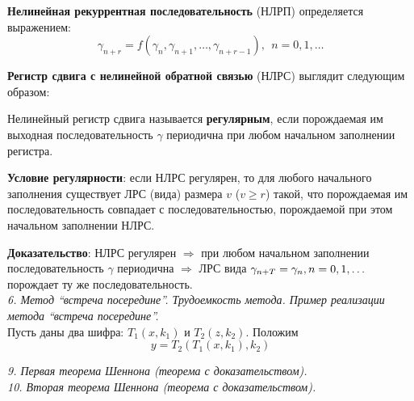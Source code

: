 \textbf{Нелинейная рекуррентная последовательность} (НЛРП) определяется выражением:
$$\gamma_{n+r} = f (\gamma_n, \gamma_{n+1}, \ldots, \gamma_{n+r-1}),\ \ n = 0,1,\ldots$$

\textbf{Регистр сдвига с нелинейной обратной связью} (НЛРС) выглядит следующим образом:

\medskip


\medskip

Нелинейный регистр сдвига называется \textbf{регулярным}, если порождаемая им выходная последовательность $\gamma$ периодична при любом начальном заполнении регистра.

\textbf{Условие регулярности}: если НЛРС регулярен, то для любого начального заполнения существует ЛРС (вида) размера $v$ ($v \ge r$) такой, что порождаемая им последовательность совпадает с последовательностью, порождаемой при этом начальном заполнении НЛРС.

\textbf{Доказательство}: НЛРС регулярен $\Rightarrow$ при любом начальном заполнении последовательность $\gamma$ периодична $\Rightarrow$ ЛРС вида $\gamma_{n+T} = \gamma_n,\\ n = 0, 1, \ldots$ порождает ту же последовательность. \\

\noindent \textit{6. Метод “встреча посередине”. Трудоемкость метода. Пример реализации метода “встреча посередине”.} \\

Пусть даны два шифра: $T_1 (x, k_1)$ и $T_2 (z, k_2)$. Положим
$$y = T_2 (T_1 (x, k_1), k_2)$$

\noindent \textit{9. Первая теорема Шеннона (теорема с доказательством).} \\



\noindent \textit{10. Вторая теорема Шеннона (теорема с доказательством).} \\


